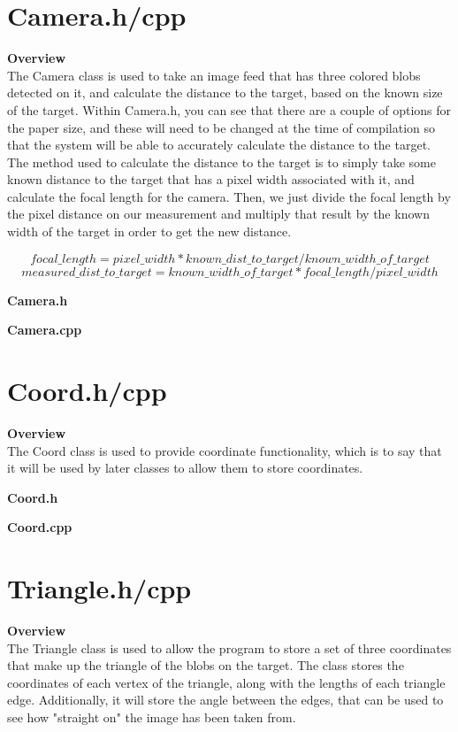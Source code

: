 \documentclass[11pt]{book}
\begin{document}



\section*{Camera.h/cpp}
\large{\textbf{Overview}}\\
\normalsize
\noindent The Camera class is used to take an image feed that has three colored blobs detected on it, and calculate the distance to the target, based on the known size of the target. Within Camera.h, you can see that there are a couple of options for the paper size, and these will need to be changed at the time of compilation so that the system will be able to accurately calculate the distance to the target. The method used to calculate the distance to the target is to simply take some known distance to the target that has a pixel width associated with it, and calculate the focal length for the camera. Then, we just divide the focal length by the pixel distance on our measurement and multiply that result by the known width of the target in order to get the new distance.

\[focal\_length = pixel\_width * known\_dist\_to\_target / known\_width\_of\_target \]
\[measured\_dist\_to\_target = known\_width\_of\_target * focal\_length / pixel\_width \]

\large{\textbf{Camera.h}}

\large{\textbf{Camera.cpp}}


\section*{Coord.h/cpp}
\large{\textbf{Overview}}\\
\normalsize
\noindent The Coord class is used to provide coordinate functionality, which is to say that it will be used by later classes to allow them to store coordinates.

\large{\textbf{Coord.h}}

\large{\textbf{Coord.cpp}}



\section*{Triangle.h/cpp}
\large{\textbf{Overview}}\\
\normalsize
\noindent The Triangle class is used to allow the program to store a set of three coordinates that make up the triangle of the blobs on the target. The class stores the coordinates of each vertex of the triangle, along with the lengths of each triangle edge. Additionally, it will store the angle between the edges, that can be used to see how "straight on" the image has been taken from.
\end{document}
